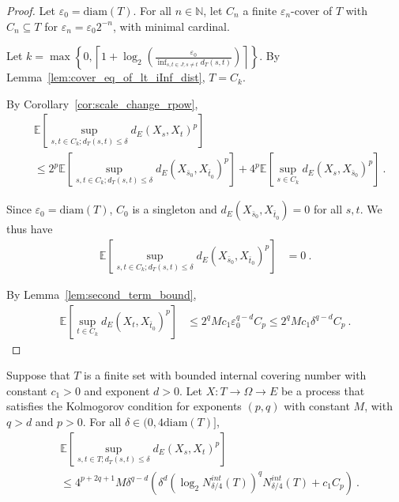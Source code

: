 \begin{proof}
Let $\varepsilon_0 = \mathrm{diam}(T)$.
For all $n \in \mathbb{N}$, let $C_n$ a finite $\varepsilon_n$-cover of $T$ with $C_n \subseteq T$ for $\varepsilon_n = \varepsilon_0 2^{-n}$, with minimal cardinal.

Let $k = \max \left\{ 0, \left\lceil 1 + \log_2\left(\frac{\varepsilon_0}{\inf_{s, t \in J; s \ne t}d_T(s, t)}\right) \right\rceil \right\}$.
By Lemma~\ref{lem:cover_eq_of_lt_iInf_dist}, $T = C_k$.

By Corollary~\ref{cor:scale_change_rpow},
\begin{align*}
  &\mathbb{E}\left[ \sup_{s, t \in C_k; d_T(s, t) \le \delta} d_E(X_s, X_t)^p \right]
  \\
  &\le 2^p \mathbb{E}\left[ \sup_{s, t \in C_k; d_T(s, t) \le \delta} d_E(X_{\bar{s}_0}, X_{\bar{t}_0})^p \right]
    + 4^p \mathbb{E}\left[ \sup_{s \in C_k} d_E(X_s, X_{\bar{s}_0})^p \right]
  \: .
\end{align*}

Since $\varepsilon_0 = \mathrm{diam}(T)$, $C_0$ is a singleton and $d_E(X_{\bar{s}_0}, X_{\bar{t}_0}) = 0$ for all $s, t$.
We thus have
\begin{align*}
  \mathbb{E} \left[ \sup_{s, t \in C_k; d_T(s, t) \le \delta} d_E(X_{\bar{s}_0}, X_{\bar{t}_0})^p \right]
  &= 0
  \: .
\end{align*}

By Lemma~\ref{lem:second_term_bound},
\begin{align*}
  \mathbb{E} \left[\sup_{t \in C_k} d_E(X_t, X_{\bar{t}_0})^p \right]
  &\le 2^q M c_1 \varepsilon_0^{q - d} C_p
  \le 2^q M c_1 \delta^{q - d} C_p
  \: .
\end{align*}
\end{proof}


\begin{theorem}\label{thm:finite_set_bound_of_dist_le_of_le_diam}
  \leanok
Suppose that $T$ is a finite set with bounded internal covering number with constant $c_1>0$ and exponent $d > 0$.
Let $X : T \to \Omega \to E$ be a process that satisfies the Kolmogorov condition for exponents $(p,q)$ with constant $M$, with $q > d$ and $p > 0$.
For all $\delta \in (0, 4\mathrm{diam}(T)]$,
\begin{align*}
  &\mathbb{E}\left[ \sup_{s, t \in T; d_T(s, t) \le \delta} d_E(X_s, X_t)^p \right]
  \\
  &\le 4^{p+2q+1} M \delta^{q-d} \left(\delta^d \left(\log_2 N^{int}_{\delta/4}(T) \right)^q  N^{int}_{\delta/4}(T)
    + c_1 C_p\right)
  \: .
\end{align*}
\end{theorem}

